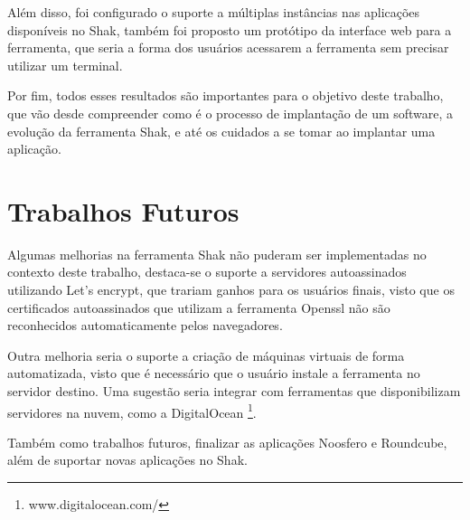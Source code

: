 Além disso, foi configurado o suporte a múltiplas instâncias nas aplicações disponíveis
no Shak, também foi proposto um protótipo
da interface web para a ferramenta, que seria a forma dos usuários acessarem a
ferramenta sem precisar utilizar um terminal.

Por fim, todos esses resultados são importantes para o objetivo deste trabalho, que vão
desde compreender como é o processo de implantação de um software, a evolução
da ferramenta Shak, e até os cuidados
a se tomar ao implantar uma aplicação.
 
\section{Trabalhos Futuros}
%
Algumas melhorias na ferramenta Shak não puderam ser implementadas no contexto
deste trabalho, destaca-se o suporte a servidores autoassinados utilizando
Let's encrypt, que trariam ganhos para os usuários finais, visto que os certificados
autoassinados que utilizam a ferramenta Openssl não são reconhecidos automaticamente
pelos navegadores. 

Outra melhoria seria o suporte a criação de máquinas virtuais de forma automatizada, visto
que é necessário que o usuário instale a ferramenta no servidor destino. Uma sugestão
seria integrar com ferramentas que disponibilizam servidores na nuvem, como a 
DigitalOcean \footnote{www.digitalocean.com/}. 
 
Também como trabalhos futuros, finalizar as aplicações Noosfero e Roundcube, além
de suportar novas aplicações no Shak.
